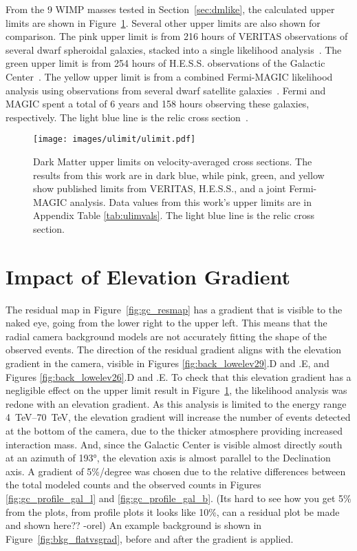   From the 9 WIMP masses tested in Section~\ref{sec:dmlike}, the calculated upper limits are shown in Figure~\ref{fig:ulim}.
  Several other upper limits are also shown for comparison.
  The pink upper limit is from 216 hours of VERITAS observations of several dwarf spheroidal galaxies, stacked into a single likelihood analysis~\cite{verdsphul}.
  The green upper limit is from 254 hours of H.E.S.S. observations of the Galactic Center~\cite{hessgcul}.
  The yellow upper limit is from a combined Fermi-MAGIC likelihood analysis using observations from several dwarf satellite galaxies~\cite{fermagicul}.
  Fermi and MAGIC spent a total of 6 years and 158 hours observing these galaxies, respectively.
  The light blue line is the relic cross section~\cite{updatedWIMPRelicCrossSection}.
  
  \begin{figure}[ht]
    \centering
    \texttt{[image: images/ulimit/ulimit.pdf]}
    \caption[Dark Matter Upper Limit Plot]{
      Dark Matter upper limits on velocity-averaged cross sections.
      The results from this work are in dark blue, while pink, green, and yellow show published limits from VERITAS, H.E.S.S., and a joint Fermi-MAGIC analysis.
      Data values from this work's upper limits are in Appendix Table \ref{tab:ulimvals}.
      The light blue line is the relic cross section.
    }
    \label{fig:ulim}
  \end{figure}
  
\FloatBarrier

\section{Impact of Elevation Gradient}\label{sec:elevgradient}

  The residual map in Figure~\ref{fig:gc_resmap} has a gradient that is visible to the naked eye, going from the lower right to the upper left.
  This means that the radial camera background models are not accurately fitting the shape of the observed events.
  The direction of the residual gradient aligns with the elevation gradient in the camera, visible in Figures \ref{fig:back_lowelev29}.D and .E, and Figures \ref{fig:back_lowelev26}.D and .E.
  To check that this elevation gradient has a negligible effect on the upper limit result in Figure~\ref{fig:ulim}, the likelihood analysis was redone with an elevation gradient.
  As this analysis is limited to the energy range \SIrange{4}{70}{TeV}, the elevation gradient will increase the number of events detected at the bottom of the camera, due to the thicker atmosphere providing increased interaction mass.
  And, since the Galactic Center is visible almost directly south at an azimuth of \ang{193}, the elevation axis is almost parallel to the Declination axis.
  A gradient of 5\%/degree was chosen due to the relative differences between the total modeled counts and the observed counts in Figures \ref{fig:gc_profile_gal_l} and \ref{fig:gc_profile_gal_b}.
  {\color{red}(Its hard to see how you get 5\% from the plots, from profile plots it looks like 10\%, can a residual plot be made and shown here?? -orel)}
  An example background is shown in Figure~\ref{fig:bkg_flatvsgrad}, before and after the gradient is applied.
  

